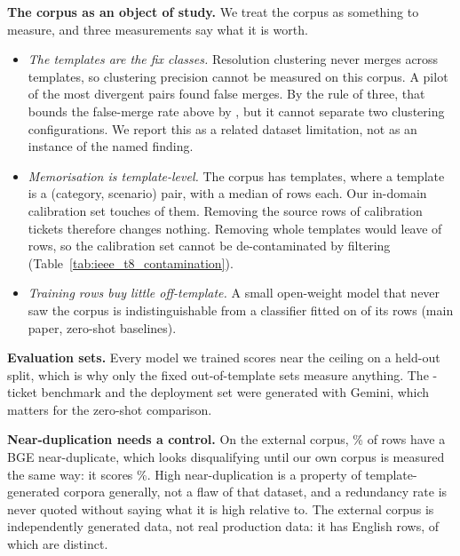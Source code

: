 \documentclass[conference,onecolumn,a4paper]{IEEEtran}
\begin{document}
\textbf{The corpus as an object of study.} We treat the corpus as something to measure, and three measurements say what it is worth.
\begin{itemize}
\item \emph{The templates are the fix classes.} Resolution clustering never merges across templates, so clustering precision cannot be measured on this corpus. A pilot of the most divergent pairs found  false merges. By the rule of three, that bounds the false-merge rate above by , but it cannot separate two clustering configurations. We report this as a related dataset limitation, not as an instance of the named finding.
\item \emph{Memorisation is template-level.} The corpus has  templates, where a template is a (category, scenario) pair, with a median of  rows each. Our in-domain calibration set touches  of them. Removing the source rows of calibration tickets therefore changes nothing. Removing whole templates would leave  of  rows, so the calibration set cannot be de-contaminated by filtering (Table~\ref{tab:ieee_t8_contamination}).
\item \emph{Training rows buy little off-template.} A small open-weight model that never saw the corpus is indistinguishable from a classifier fitted on  of its rows (main paper, zero-shot baselines).
\end{itemize}



\textbf{Evaluation sets.} Every model we trained scores near the ceiling on a held-out split, which is why only the fixed out-of-template sets measure anything. The -ticket benchmark and the deployment set were generated with Gemini, which matters for the zero-shot comparison.

\textbf{Near-duplication needs a control.} On the external corpus, \% of rows have a BGE near-duplicate, which looks disqualifying until our own corpus is measured the same way: it scores \%. High near-duplication is a property of template-generated corpora generally, not a flaw of that dataset, and a redundancy rate is never quoted without saying what it is high relative to. The external corpus is independently generated data, not real production data: it has  English rows, of which  are distinct.
\end{document}
